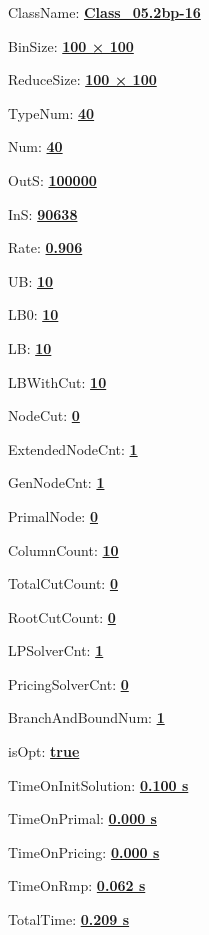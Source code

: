 \documentclass[11pt]{article}
\begin{document}
\pagestyle{empty}


ClassName: \underline{\textbf{Class_05.2bp-16}}
\par
BinSize: \underline{\textbf{100 × 100}}
\par
ReduceSize: \underline{\textbf{100 × 100}}
\par
TypeNum: \underline{\textbf{40}}
\par
Num: \underline{\textbf{40}}
\par
OutS: \underline{\textbf{100000}}
\par
InS: \underline{\textbf{90638}}
\par
Rate: \underline{\textbf{0.906}}
\par
UB: \underline{\textbf{10}}
\par
LB0: \underline{\textbf{10}}
\par
LB: \underline{\textbf{10}}
\par
LBWithCut: \underline{\textbf{10}}
\par
NodeCut: \underline{\textbf{0}}
\par
ExtendedNodeCnt: \underline{\textbf{1}}
\par
GenNodeCnt: \underline{\textbf{1}}
\par
PrimalNode: \underline{\textbf{0}}
\par
ColumnCount: \underline{\textbf{10}}
\par
TotalCutCount: \underline{\textbf{0}}
\par
RootCutCount: \underline{\textbf{0}}
\par
LPSolverCnt: \underline{\textbf{1}}
\par
PricingSolverCnt: \underline{\textbf{0}}
\par
BranchAndBoundNum: \underline{\textbf{1}}
\par
isOpt: \underline{\textbf{true}}
\par
TimeOnInitSolution: \underline{\textbf{0.100 s}}
\par
TimeOnPrimal: \underline{\textbf{0.000 s}}
\par
TimeOnPricing: \underline{\textbf{0.000 s}}
\par
TimeOnRmp: \underline{\textbf{0.062 s}}
\par
TotalTime: \underline{\textbf{0.209 s}}
\par
\newpage


\end{document}
